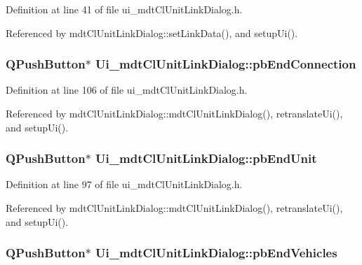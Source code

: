 Definition at line 41 of file ui\-\_\-mdt\-Cl\-Unit\-Link\-Dialog.\-h.



Referenced by mdt\-Cl\-Unit\-Link\-Dialog\-::set\-Link\-Data(), and setup\-Ui().

\hypertarget{class_ui__mdt_cl_unit_link_dialog_acb5b15bd5a4135365b40c077fc0716cf}{
\subsubsection[{pb\-End\-Connection}]{\setlength{\rightskip}{0pt plus 5cm}Q\-Push\-Button$\ast$ Ui\-\_\-mdt\-Cl\-Unit\-Link\-Dialog\-::pb\-End\-Connection}}\label{class_ui__mdt_cl_unit_link_dialog_acb5b15bd5a4135365b40c077fc0716cf}


Definition at line 106 of file ui\-\_\-mdt\-Cl\-Unit\-Link\-Dialog.\-h.



Referenced by mdt\-Cl\-Unit\-Link\-Dialog\-::mdt\-Cl\-Unit\-Link\-Dialog(), retranslate\-Ui(), and setup\-Ui().

\hypertarget{class_ui__mdt_cl_unit_link_dialog_a1f610d4a794903cc1a90a1a9881a5d0b}{
\subsubsection[{pb\-End\-Unit}]{\setlength{\rightskip}{0pt plus 5cm}Q\-Push\-Button$\ast$ Ui\-\_\-mdt\-Cl\-Unit\-Link\-Dialog\-::pb\-End\-Unit}}\label{class_ui__mdt_cl_unit_link_dialog_a1f610d4a794903cc1a90a1a9881a5d0b}


Definition at line 97 of file ui\-\_\-mdt\-Cl\-Unit\-Link\-Dialog.\-h.



Referenced by mdt\-Cl\-Unit\-Link\-Dialog\-::mdt\-Cl\-Unit\-Link\-Dialog(), retranslate\-Ui(), and setup\-Ui().

\hypertarget{class_ui__mdt_cl_unit_link_dialog_a26d99c0c35027e17c59c764d89d67ed0}{
\subsubsection[{pb\-End\-Vehicles}]{\setlength{\rightskip}{0pt plus 5cm}Q\-Push\-Button$\ast$ Ui\-\_\-mdt\-Cl\-Unit\-Link\-Dialog\-::pb\-End\-Vehicles}}\label{class_ui__mdt_cl_unit_link_dialog_a26d99c0c35027e17c59c764d89d67ed0}


